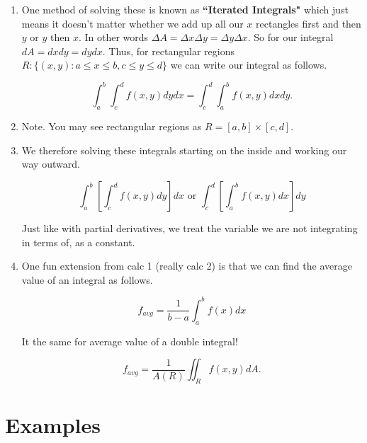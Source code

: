 \documentclass[11pt]{article}
\begin{document}
\begin{enumerate}
\item One method of solving these is known as \textbf{``Iterated Integrals"} which just means it doesn't matter whether we add up all our $x$ rectangles first and then $y$ or $y$ then $x$. In other words $\Delta A = \Delta x \Delta y = \Delta y \Delta x$. So for our integral $dA = dx dy = dy dx$. Thus, for rectangular regions $R: \{(x,y) : a \leq x \leq b, c \leq y \leq d\}$ we can write our integral as follows.

\begin{equation*}
    \int_a^b \int_c^d f(x,y) dydx = \int_c^d \int_a^b f(x,y) dxdy.
\end{equation*}

\item Note. You may see rectangular regions as $R = [a,b] \times [c,d]$.

\item We therefore solving these integrals starting on the inside and working our way outward.

\begin{equation*}
    \int_a^b \left[\int_c^d f(x,y) dy \right] dx \text{ or }  \int_c^d \left[\int_a^b f(x,y) dx \right] dy
\end{equation*}

Just like with partial derivatives, we treat the variable we are not integrating in terms of, as a constant.

\item One fun extension from calc 1 (really calc 2) is that we can find the average value of an integral as follows.

\begin{equation*}
    f_{avg} = \frac{1}{b-a} \int_a^b f(x) dx
\end{equation*}

It the same for average value of a double integral!

\begin{equation*}
    f_{avg} =  \frac{1}{A(R)}\iint_R f(x,y) dA.
\end{equation*}

\end{enumerate}




\newpage




\section{Examples}
\end{document}
